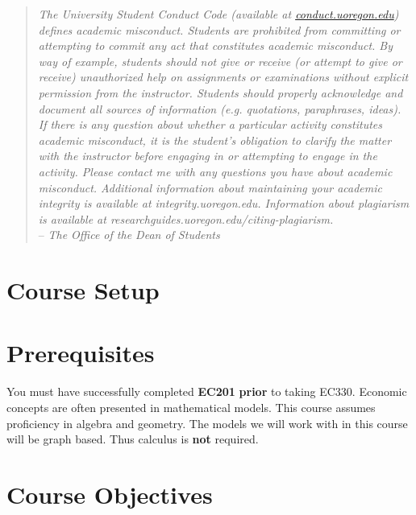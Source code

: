 \documentclass[11pt]{article}
\begin{document}
\begin{quote}
\textit{The University Student Conduct Code (available at \href{https://dos.uoregon.edu/conduct}{conduct.uoregon.edu}) defines academic misconduct. Students are prohibited from committing or attempting to commit any act that constitutes academic misconduct. By way of example, students should not give or receive (or attempt to give or receive) unauthorized help on assignments or examinations without explicit permission from the instructor. Students should properly acknowledge and document all sources of information (e.g. quotations, paraphrases, ideas).} \\

\textit{If there is any question about whether a particular activity constitutes academic misconduct, it is the student’s obligation to clarify the matter with the instructor before engaging in or attempting to engage in the activity. Please contact me with any questions you have about academic misconduct.	Additional information about maintaining your academic integrity is available at integrity.uoregon.edu. Information about plagiarism is available at researchguides.uoregon.edu/citing-plagiarism.} \\
	
	
	\hspace{3in }-- \textit{The Office of the Dean of Students}
\end{quote}

\section*{Course Setup}

	
	\section*{Prerequisites}
	You must have successfully completed \textbf{EC201} \textbf{prior} to taking EC330. Economic concepts are often presented in mathematical models. This course assumes proficiency in algebra and geometry. The models we will work with in this course will be graph based. Thus calculus is \textbf{not} required.
	
	
	\section*{Course Objectives}
	
\end{document}

